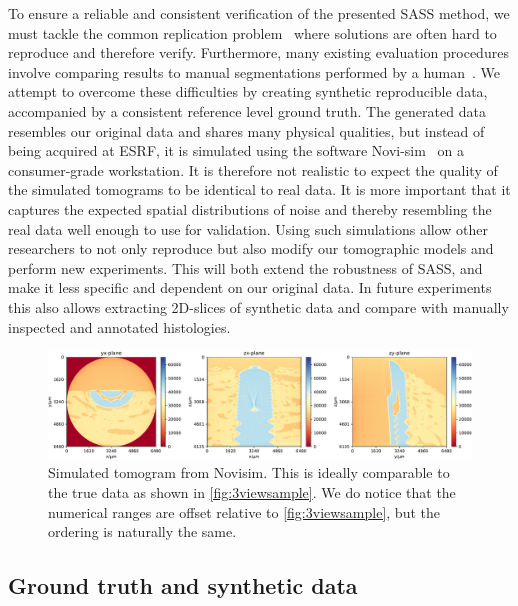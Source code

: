To ensure a reliable and consistent verification of the presented SASS method,
we must tackle the common replication problem~\cite{replication-crisis} where
solutions are often hard to reproduce and therefore verify. Furthermore, many
existing evaluation procedures involve comparing results to manual
segmentations performed by a human~\cite{seg_literature_review}. We attempt to
overcome these difficulties by creating synthetic reproducible data,
accompanied by a consistent reference level ground truth. The generated data
resembles our original data and shares many physical qualities, but instead of
being acquired at ESRF, it is simulated using the software
Novi-sim~\cite{novisim} on a consumer-grade workstation. It is therefore not
realistic to expect the quality of the simulated tomograms to be identical to
real data. It is more important that it captures the expected spatial
distributions of noise and thereby resembling the real data well enough to use
for validation.  Using such simulations allow other researchers to not only
reproduce but also modify our tomographic models and perform new experiments.
This will both extend the robustness of SASS, and make it less specific and
dependent on our original data.  In future experiments this also allows
extracting 2D-slices of synthetic data and compare with manually inspected and
annotated histologies.

\begin{figure}
  \centering
  \includegraphics[width=\textwidth]{figures/novisim_raw_2x.pdf}
  \caption{Simulated tomogram from Novisim. This is ideally comparable to the
	true data as shown in \cref{fig:3viewsample}. We do notice that the
	numerical ranges are offset relative to \cref{fig:3viewsample}, but the
	ordering is naturally the same.}
  \label{fig:novisimraw}
\end{figure}

\subsection{Ground truth and synthetic data}

